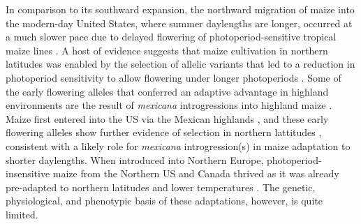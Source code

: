 \documentclass[9pt,twocolumn,twoside,lineno]{biorxiv}
\newcommand{\mex}{\textit{mexicana}\xspace}
\begin{document}
In comparison to its southward expansion, the northward migration of maize into the modern-day United States, where summer daylengths are longer, occurred at a much slower pace \cite{Da_Fonseca2015-zh, Swarts2017-ge} due to delayed flowering of photoperiod-sensitive tropical maize lines \cite{Hung2012-ms}.
A host of evidence suggests that maize cultivation in northern latitudes was enabled by the selection of allelic variants that led to a reduction in photoperiod sensitivity to allow flowering under longer photoperiods \cite{Liang2018-af, Guo2018-on, Coles2010-db, Huang2018-ga, Yang2013-lg, Salvi2007-ku, Hung2012-ms}.
Some of the early flowering alleles that conferred an adaptive advantage in highland environments are the result of \mex introgressions into highland maize \cite{Guo2018-on}.
Maize first entered into the US via the Mexican highlands \cite{Da_Fonseca2015-zh}, and these early flowering alleles show further evidence of selection in northern lattitudes \cite{Guo2018-on}, consistent with a likely role for \mex introgression(s) in maize adaptation to shorter daylengths. 
When introduced into Northern Europe, photoperiod-insensitive maize from the Northern US and Canada thrived as it was already pre-adapted to northern latitudes and lower temperatures \cite{Brandenburg2017-ii}.
The genetic, physiological, and phenotypic basis of these adaptations, however, is quite limited.
\end{document}

